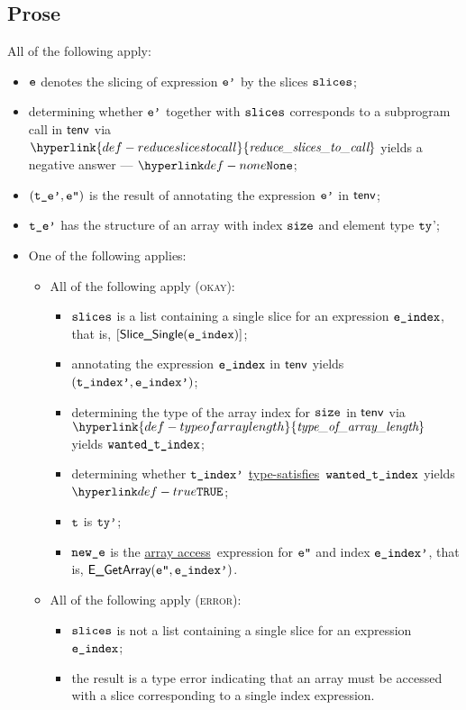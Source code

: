 \documentclass{book}
\newcommand\ProseOrTypeError[0]{\ProseTerminateAs{\TypeErrorConfig}}
\newcommand\typesatisfies[0]{\hyperlink{def-typesatisfies}{type-satisfies}}
\newcommand\arrayaccess[0]{\hyperlink{def-arrayaccess}{array access}}
\newcommand\reduceslicestocall[0]{\hyperlink{def-reduceslicestocall}{\textfunc{reduce\_slices\_to\_call}}}
\newcommand\typeofarraylength[0]{\hyperlink{def-typeofarraylength}{\textfunc{type\_of\_array\_length}}}
\begin{document}
\subsection{Prose}
All of the following apply:
\begin{itemize}
  \item $\texttt{e}$ denotes the slicing of expression $\texttt{e'}$ by the slices $\texttt{slices}$;
  \item determining whether $\texttt{e'}$ together with $\texttt{slices}$ corresponds to a subprogram call
        in $\textsf{tenv}$ via $\reduceslicestocall$ yields a negative answer --- $\None$\ProseOrTypeError;
  \item $(\texttt{t\_e'},\texttt{e''})$ is the result of annotating the expression $\texttt{e'}$ in $\textsf{tenv}$;
  \item $\texttt{t\_e'}$ has the structure of an array with index $\texttt{size}$ and element type $\texttt{ty}$';
  \item One of the following applies:
  \begin{itemize}
    \item All of the following apply (\textsc{okay}):
    \begin{itemize}
      \item $\texttt{slices}$ is a list containing a single slice for an expression $\texttt{e\_index}$, that is, $[\textsf{Slice\_Single}(\texttt{e\_index})]$;
      \item annotating the expression $\texttt{e\_index}$ in $\textsf{tenv}$ yields $(\texttt{t\_index'}, \texttt{e\_index'})$\ProseOrTypeError;
      \item determining the type of the array index for $\texttt{size}$ in $\textsf{tenv}$ via \\ $\typeofarraylength$
            yields $\texttt{wanted\_t\_index}$;
      \item determining whether $\texttt{t\_index'}$ \typesatisfies\ $\texttt{wanted\_t\_index}$ yields \\
            $\True$\ProseOrTypeError;
      \item $\texttt{t}$ is $\texttt{ty'}$;
      \item $\texttt{new\_e}$ is the \arrayaccess\ expression for $\texttt{e''}$ and index $\texttt{e\_index'}$, that is, $\textsf{E\_GetArray}(\texttt{e''}, \texttt{e\_index'})$.
    \end{itemize}

    \item All of the following apply (\textsc{error}):
    \begin{itemize}
      \item $\texttt{slices}$ is not a list containing a single slice for an expression $\texttt{e\_index}$;
      \item the result is a type error indicating that an array must be accessed with a slice corresponding
            to a single index expression.
    \end{itemize}
  \end{itemize}
\end{itemize}
\end{document}
